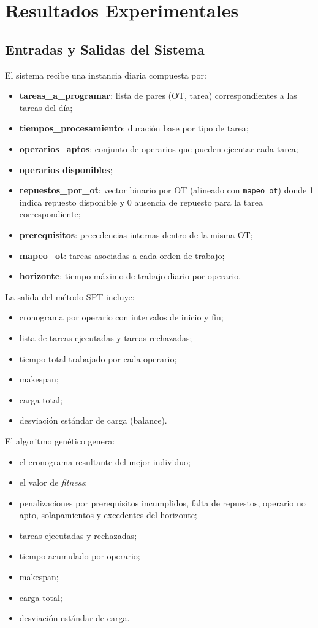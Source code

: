 \chapter{Resultados Experimentales}
\label{chap:ejecucion-obtencion-resultados}


\section{Entradas y Salidas del Sistema}

El sistema recibe una instancia diaria compuesta por:
\begin{itemize}
    \item \textbf{tareas\_a\_programar}: lista de pares (OT, tarea) correspondientes a las tareas del día;
    \item \textbf{tiempos\_procesamiento}: duración base por tipo de tarea;
    \item \textbf{operarios\_aptos}: conjunto de operarios que pueden ejecutar cada tarea;
    \item \textbf{operarios disponibles};
    \item \textbf{repuestos\_por\_ot}: vector binario por OT (alineado con \texttt{mapeo\_ot}) donde 1 indica repuesto disponible y 0 ausencia de repuesto para la tarea correspondiente;
    \item \textbf{prerequisitos}: precedencias internas dentro de la misma OT;
    \item \textbf{mapeo\_ot}: tareas asociadas a cada orden de trabajo;
    \item \textbf{horizonte}: tiempo máximo de trabajo diario por operario.
\end{itemize}

\noindent
La salida del método SPT incluye:
\begin{itemize}
    \item cronograma por operario con intervalos de inicio y fin;
    \item lista de tareas ejecutadas y tareas rechazadas;
    \item tiempo total trabajado por cada operario;
    \item makespan;
    \item carga total;
    \item desviación estándar de carga (balance).
\end{itemize}

\noindent
El algoritmo genético genera:
\begin{itemize}
    \item el cronograma resultante del mejor individuo;
    \item el valor de \textit{fitness};
    \item penalizaciones por prerequisitos incumplidos, falta de repuestos, operario no apto, solapamientos y excedentes del horizonte;
    \item tareas ejecutadas y rechazadas;
    \item tiempo acumulado por operario;
    \item makespan;
    \item carga total;
    \item desviación estándar de carga.
\end{itemize}

